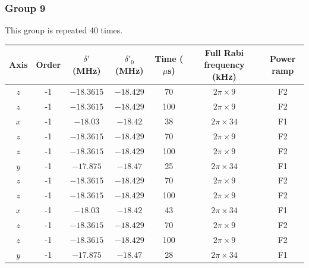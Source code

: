 \documentclass[aps,secnumarabic,amsmath,amssymb]{revtex4}
\begin{document}
\subsubsection{Group 9}
This group is repeated 40 times.
\begin{center}
  \begin{tabular}{|c|c|c|c|c|c|c|}
    \hline
    Axis&Order&$\delta'$ (MHz)&$\delta'_0$ (MHz)&Time ($\mu$s)&Full Rabi frequency (kHz)&Power ramp\\\hline
    $z$&-1&$-18.3615$&$-18.429$&70&$2\pi\times9$&F2\\\hline
    $z$&-1&$-18.3615$&$-18.429$&100&$2\pi\times9$&F2\\\hline
    $x$&-1&$-18.03$&$-18.42$&38&$2\pi\times34$&F1\\\hline
    $z$&-1&$-18.3615$&$-18.429$&70&$2\pi\times9$&F2\\\hline
    $z$&-1&$-18.3615$&$-18.429$&100&$2\pi\times9$&F2\\\hline
    $y$&-1&$-17.875$&$-18.47$&25&$2\pi\times34$&F1\\\hline
    $z$&-1&$-18.3615$&$-18.429$&70&$2\pi\times9$&F2\\\hline
    $z$&-1&$-18.3615$&$-18.429$&100&$2\pi\times9$&F2\\\hline
    $x$&-1&$-18.03$&$-18.42$&43&$2\pi\times34$&F1\\\hline
    $z$&-1&$-18.3615$&$-18.429$&70&$2\pi\times9$&F2\\\hline
    $z$&-1&$-18.3615$&$-18.429$&100&$2\pi\times9$&F2\\\hline
    $y$&-1&$-17.875$&$-18.47$&28&$2\pi\times34$&F1\\\hline
  \end{tabular}
\end{center}


\end{document}
